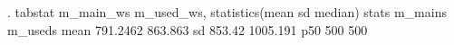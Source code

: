 . tabstat m_main_ws m_used_ws, statistics(mean sd median)
{\smallskip}
   stats {\VBAR}  m_main{\tytilde}s  m_used{\tytilde}s
    mean {\VBAR}  791.2462   863.863
      sd {\VBAR}    853.42  1005.191
     p50 {\VBAR}       500       500
{\smallskip}
